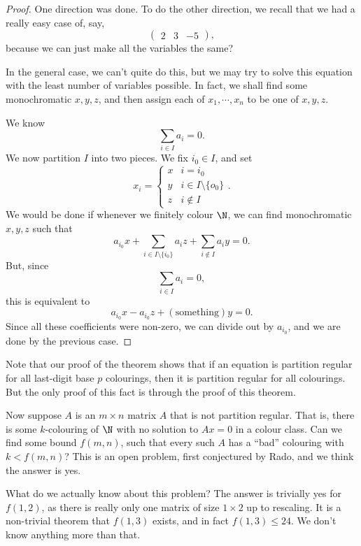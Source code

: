 \documentclass[a4paper]{article}
\begin{document}
\begin{proof}
  One direction was done. To do the other direction, we recall that we had a really easy case of, say,
  \[
    \begin{pmatrix}
      2 & 3 & -5
    \end{pmatrix},
  \]
  because we can just make all the variables the same?

  In the general case, we can't quite do this, but we may try to solve this equation with the least number of variables possible. In fact, we shall find some monochromatic $x, y, z$, and then assign each of $x_1, \cdots, x_n$ to be one of $x, y, z$.

  We know
  \[
    \sum_{i \in I} a_i = 0.
  \]
  We now partition $I$ into two pieces. We fix $i_0 \in I$, and set
  \[
    x_i =
    \begin{cases}
      x & i = i_0\\
      y & i \in I \setminus \{o_0\}\\
      z & i \not\in I
    \end{cases}.
  \]
  We would be done if whenever we finitely colour $\N$, we can find monochromatic $x, y, z$ such that
  \[
    a_{i_0}x + \sum_{i \in I \setminus \{i_0\}} a_i z + \sum_{i \not \in I} a_i y = 0.
  \]
  But, since
  \[
    \sum_{i \in I} a_i = 0,
  \]
  this is equivalent to
  \[
    a_{i_0} x - a_{i_0} z + (\text{something}) y = 0.
  \]
  Since all these coefficients were non-zero, we can divide out by $a_{i_0}$, and we are done by the previous case.
\end{proof}

Note that our proof of the theorem shows that if an equation is partition regular for all last-digit base $p$ colourings, then it is partition regular for all colourings. But the only proof of this fact is through the proof of this theorem.

Now suppose $A$ is an $m \times n $ matrix $A$ that is not partition regular. That is, there is some $k$-colouring of $\N$ with no solution to $Ax = 0$ in a colour class. Can we find some bound $f(m, n)$, such that every such $A$ has a ``bad'' colouring with $k < f(m, n)$? This is an open problem, first conjectured by Rado, and we think the answer is yes.

What do we actually know about this problem? The answer is trivially yes for $f(1, 2)$, as there is really only one matrix of size $1 \times 2$ up to rescaling. It is a non-trivial theorem that $f(1, 3)$ exists, and in fact $f(1, 3) \leq 24$. We don't know anything more than that.
\end{document}
